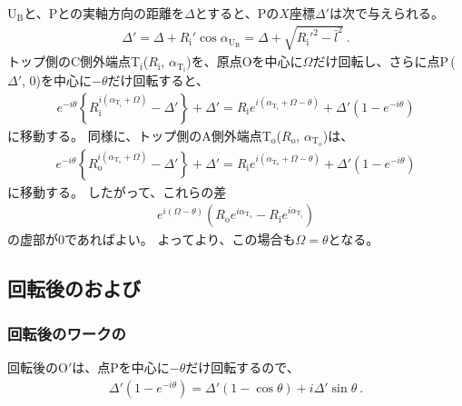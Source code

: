 \ReceiverPlateCenter U$_\mathrm B$と、\TableCenter Pとの実軸方向の距離を$\Delta$とすると、\TableCenter Pの$X$座標$\Delta'$は次で与えられる。
\begin{align}
  \label{eq:tableCenter}
  \Delta'
  = \Delta+R_\mathrm i'\cos\alpha_{\mathrm U_\mathrm B} = \Delta+\sqrt{R_\mathrm i'^2-\bar l^2}\ .
\end{align}
トップ側のC側外端点T$_\mathrm i$($R_\mathrm i$, $\alpha_{\mathrm T_\mathrm i}$)を、原点Oを中心に$\Omega$だけ回転し、さらに点P\,($\Delta'$, $0$)を中心に$-\theta$だけ回転すると、
\begin{align}
  \label{eq:afterfttable}
  e^{-i\theta}\left\{R_\mathrm i^{i(\alpha_{\mathrm T_\mathrm i}+\Omega)}-\Delta'\right\}+\Delta'
  = R_\mathrm ie^{i(\alpha_{\mathrm T_\mathrm i}+\Omega-\theta)}+\Delta'\left(1-e^{-i\theta}\right)
\end{align}
に移動する。
同様に、トップ側のA側外端点T$_\mathrm o$($R_\mathrm o$, $\alpha_{\mathrm T_\mathrm o}$)は、
\begin{align*}
  e^{-i\theta}\!\left\{R_\mathrm o^{i(\alpha_{\mathrm T_\mathrm o}+\Omega)}-\Delta'\right\}+\Delta'
  = R_\mathrm ie^{i(\alpha_{\mathrm T_\mathrm o}+\Omega-\theta)}+\Delta'\!\left(1-e^{-i\theta}\right)
\end{align*}
に移動する。
したがって、これらの差
\begin{align*}
  e^{i(\Omega-\theta)}
  \left(R_\mathrm oe^{i\alpha_{\mathrm T_\mathrm o}}-R_\mathrm ie^{i\alpha_{\mathrm T_\mathrm i}}\right)
\end{align*}
の虚部が$0$であればよい。
よってより、この場合も$\Omega = \theta$となる。


\subsection{回転後の\CurvatureCenter および\ReceiverPlateContactPoint}

\subsubsection{回転後のワークの\CurvatureCenter}
回転後の\nameCurvatureCenter O$'$は、点Pを中心に$-\theta$だけ回転するので、
\begin{align*}
  \Delta'\!\left(1-e^{-i\theta}\right) = \Delta'(1-\cos\theta)+i\Delta'\sin\theta\ .
\end{align*}


